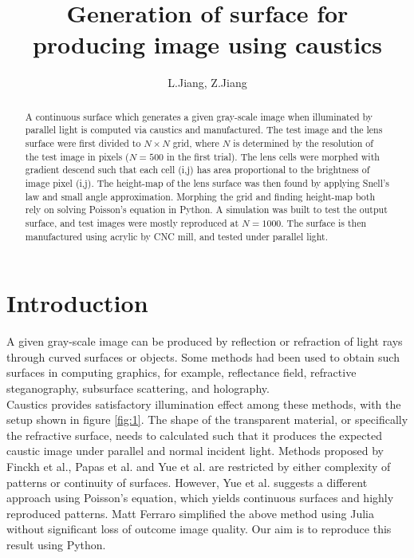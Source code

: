 \documentclass[10pt,two column]{configuration/unoesc}
\title{Generation of surface for producing image using caustics}
\author{L.Jiang, Z.Jiang}
\begin{document}
\maketitle
\begin{abstract}
    A continuous surface which generates a given gray-scale image when illuminated by parallel light is computed via caustics and manufactured. The test image and the lens surface were first divided to $N \times N$ grid, where $N$ is determined by the resolution of the test image in pixels ($N=500$ in the first trial). The lens cells were morphed with gradient descend such that each cell (i,j) has area proportional to the brightness of image pixel (i,j). The height-map of the lens surface was then found by applying Snell's law and small angle approximation. Morphing the grid and finding height-map both rely on solving Poisson's equation in Python. A simulation was built to test the output surface, and test images were mostly reproduced at $N=1000$. The surface is then manufactured using acrylic by CNC mill, and tested under parallel light.
\end{abstract}

\section{Introduction}
A given gray-scale image can be produced by reflection or refraction of light rays through curved surfaces or objects. Some methods had been used to obtain such surfaces in computing graphics, for example, reflectance field\cite{reflectancefield}, refractive steganography\cite{refractive}, subsurface scattering\cite{subsurface}, and holography\cite{holography}.\\

Caustics provides satisfactory illumination effect among these methods, with the setup shown in figure \ref{fig:1}. The shape of the transparent material, or specifically the refractive surface, needs to calculated such that it produces the expected caustic image under parallel and normal incident light. Methods proposed by Finckh et al.\cite{finckh}, Papas et al.\cite{papas} and Yue et al\cite{yue}. are restricted by either complexity of patterns or continuity of surfaces. However, Yue et al.\cite{yue2014poisson} suggests a different approach using Poisson's equation, which yields continuous surfaces and highly reproduced patterns. Matt Ferraro\cite{mattwebsite} simplified the above method using Julia without significant loss of outcome image quality. Our aim is to reproduce this result using Python.
\end{document}
